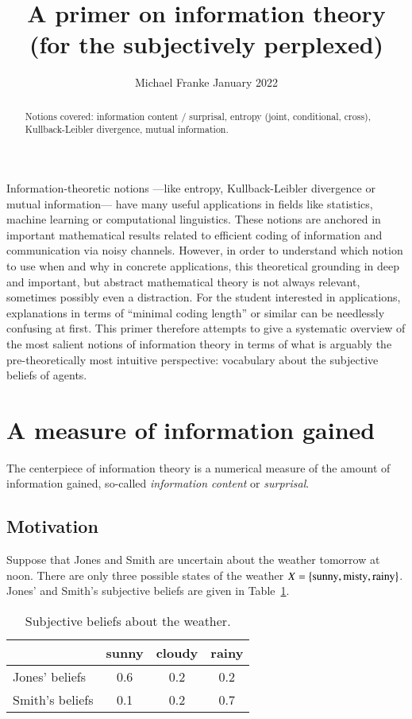\documentclass[nobib,nofonts]{tufte-handout}
\title{A primer on information theory \\ \normalsize{(for the subjectively perplexed)}}
\author[M.~Franke]{Michael Franke \hfill \normalsize{January 2022}}
\date{} %
\begin{document}
\maketitle

\begin{abstract}
\noindent
Notions covered: information content / surprisal, entropy (joint, conditional, cross), Kullback-Leibler divergence, mutual information.
\end{abstract}

\noindent
Information-theoretic notions ---like entropy, Kullback-Leibler divergence or mutual information--- have many useful applications in fields like statistics, machine learning or computational linguistics.
These notions are anchored in important mathematical results related to efficient coding of information and communication via noisy channels.
However, in order to understand which notion to use when and why in concrete applications, this theoretical grounding in deep and important, but abstract mathematical theory is not always relevant, sometimes possibly even a distraction.
For the student interested in applications, explanations in terms of ``minimal coding length'' or similar can be needlessly confusing at first.
This primer therefore attempts to give a systematic overview of the most salient notions of information theory in terms of what is arguably the pre-theoretically most intuitive perspective: vocabulary about the subjective beliefs of agents.

\section{A measure of information gained}

The centerpiece of information theory is a numerical measure of the amount of information gained, so-called \emph{information content} or \emph{surprisal}.

\subsection{Motivation}

Suppose that Jones and Smith are uncertain about the weather tomorrow at noon.
There are only three possible states of the weather $X = \left\{\text{sunny}, \text{misty}, \text{rainy}\right\}$.
Jones' and Smith's subjective beliefs are given in Table~\ref{tab:beliefs-weather}.

\begin{table}
  \centering
  \begin{tabular}{lccc}
    & sunny & cloudy & rainy \\ \midrule
    Jones' beliefs  & 0.6   & 0.2    & 0.2   \\
    Smith's beliefs & 0.1   & 0.2    & 0.7   \\
  \end{tabular}

  \caption{Subjective beliefs about the weather.}
  \label{tab:beliefs-weather}
\end{table}
\end{document}
